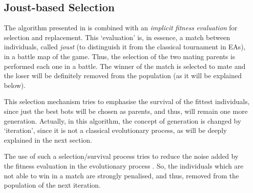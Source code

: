 \documentclass[conference]{IEEEtran}
\begin{document}
\subsection{Joust-based Selection}
The algorithm presented in \cite{GarciaGP14} %
is combined with an \textit{implicit fitness evaluation} for selection and
replacement. This `evaluation' is, in essence, a match between individuals, called {\em joust} (to distinguish it from the classical tournament in EAs), in a battle map of the game.
Thus, the selection of the two mating parents is performed each one in a battle. The winner of the match is selected to mate
and the loser will be definitely removed from the population (as it will be explained below).



This selection mechanism tries to emphasise the survival of the fittest individuals, since just the best bots will be chosen as parents, and thus, will remain one more generation. Actually, in this algorithm, the concept of generation is changed by `iteration', since it is not a classical evolutionary process, as will be deeply explained in the next section.

The use of such a selection/survival process tries to reduce the noise added by the fitness evaluation in the evolutionary process \cite{Genebot_JCST}. So, the individuals which are not able to win in a match are strongly penalised, and thus, removed from the population of the next iteration.

\end{document}
